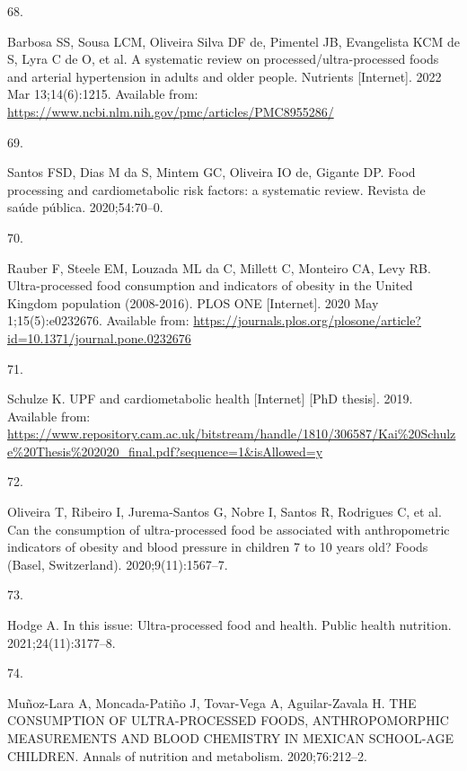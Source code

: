 \documentclass[
]{article}
\newlength{\cslhangindent}
\newlength{\csllabelwidth}
\newlength{\cslentryspacingunit} %
\newenvironment{CSLReferences}[2] %
 {%
  \setlength{\parindent}{0pt}
  \ifodd #1
  \let\oldpar\par
  \def\par{\hangindent=\cslhangindent\oldpar}
  \fi
  \setlength{\parskip}{#2\cslentryspacingunit}
 }%
 {}
\newcommand{\CSLLeftMargin}[1]{\parbox[t]{\csllabelwidth}{#1}}
\newcommand{\CSLRightInline}[1]{\parbox[t]{\linewidth - \csllabelwidth}{#1}\break}
\begin{document}
\begin{CSLReferences}{0}{0}
\leavevmode{}%
\CSLLeftMargin{68. }%
\CSLRightInline{Barbosa SS, Sousa LCM, Oliveira Silva DF de, Pimentel
JB, Evangelista KCM de S, Lyra C de O, et al. A systematic review on
processed/ultra-processed foods and arterial hypertension in adults and
older people. Nutrients {[}Internet{]}. 2022 Mar 13;14(6):1215.
Available from:
\url{https://www.ncbi.nlm.nih.gov/pmc/articles/PMC8955286/}}

\leavevmode{}%
\CSLLeftMargin{69. }%
\CSLRightInline{Santos FSD, Dias M da S, Mintem GC, Oliveira IO de,
Gigante DP. Food processing and cardiometabolic risk factors: a
systematic review. Revista de saúde pública. 2020;54:70--0. }

\leavevmode{}%
\CSLLeftMargin{70. }%
\CSLRightInline{Rauber F, Steele EM, Louzada ML da C, Millett C,
Monteiro CA, Levy RB. Ultra-processed food consumption and indicators of
obesity in the United Kingdom population (2008-2016). PLOS ONE
{[}Internet{]}. 2020 May 1;15(5):e0232676. Available from:
\url{https://journals.plos.org/plosone/article?id=10.1371/journal.pone.0232676}}

\leavevmode{}%
\CSLLeftMargin{71. }%
\CSLRightInline{Schulze K. UPF and cardiometabolic health {[}Internet{]}
{[}PhD thesis{]}. 2019. Available from:
\url{https://www.repository.cam.ac.uk/bitstream/handle/1810/306587/Kai\%20Schulze\%20Thesis\%202020_final.pdf?sequence=1\&isAllowed=y}}

\leavevmode{}%
\CSLLeftMargin{72. }%
\CSLRightInline{Oliveira T, Ribeiro I, Jurema-Santos G, Nobre I, Santos
R, Rodrigues C, et al. Can the consumption of ultra-processed food be
associated with anthropometric indicators of obesity and blood pressure
in children 7 to 10 years old? Foods (Basel, Switzerland).
2020;9(11):1567--7. }

\leavevmode{}%
\CSLLeftMargin{73. }%
\CSLRightInline{Hodge A. In this issue: Ultra-processed food and health.
Public health nutrition. 2021;24(11):3177--8. }

\leavevmode{}%
\CSLLeftMargin{74. }%
\CSLRightInline{Muñoz-Lara A, Moncada-Patiño J, Tovar-Vega A,
Aguilar-Zavala H. THE CONSUMPTION OF ULTRA-PROCESSED FOODS,
ANTHROPOMORPHIC MEASUREMENTS AND BLOOD CHEMISTRY IN MEXICAN SCHOOL-AGE
CHILDREN. Annals of nutrition and metabolism. 2020;76:212--2. }


\end{CSLReferences}
\end{document}
